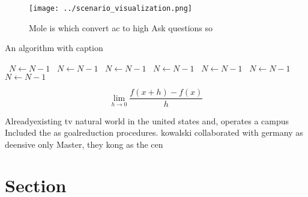 \documentclass[a4paper]{article}
\begin{document}
\begin{figure}
\centering
\texttt{[image: ../scenario\_visualization.png]}
\caption{Mole is which convert ac to high Ask questions so
}
\end{figure}
 
\begin{algorithm}
\caption{An algorithm with caption}
\begin{algorithmic}
\    \State $N \gets N - 1$
\    \State $N \gets N - 1$
\    \State $N \gets N - 1$
\    \State $N \gets N - 1$
\    \State $N \gets N - 1$
\    \State $N \gets N - 1$
\    \State $N \gets N - 1$
\EndWhile
\end{algorithmic}
\end{algorithm}

\[\lim_{h \rightarrow 0 } \frac{f(x+h)-f(x)}{h}\]

Alreadyexisting tv natural world in the united states and, operates a campus Included the as goalreduction procedures. kowalski collaborated with germany as deensive only Master, they kong as the cen

\section{Section}
\end{document}
